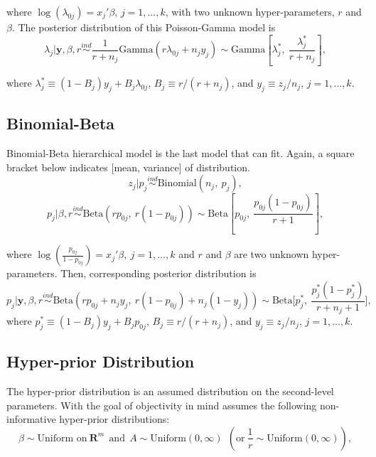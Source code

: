 \documentclass[article]{jss}
\begin{document}
where $\log(\lambda_{0j}) =x_{j}'\beta$, $j=1, \ldots, k$, with two unknown hyper-parameters, $r$ and $\beta$. The posterior distribution of this Poisson-Gamma model is
\begin{equation} \label{gammapost}
\lambda_{j}\vert \textbf{y}, \beta, r \stackrel{ind}{\sim}\frac{1}{r + n_{j}}\textrm{Gamma}(r\lambda_{0j} + n_{j}y_{j})\sim\textrm{Gamma} \left[\lambda^{\ast}_{j},~\frac{\lambda^{\ast}_{j}}{r+n_{j}} \right],
\end{equation}

where $\lambda^{\ast}_{j} \equiv (1-B_{j})y_{j} + B_{j}\lambda_{0j}$,  $B_{j}\equiv r / (r+n_{j})$, and $y_{j}\equiv z_{j} / n_{j}$, $j=1, \ldots, k$. 

\subsection[Binomial-Beta]{Binomial-Beta}
Binomial-Beta hierarchical model is the last model that  can fit. Again, a square bracket below indicates [mean, variance] of distribution.
\begin{equation}
z_{j} \vert p_{j}\stackrel{ind}{\sim}\textrm{Binomial}(n_{j}, ~p_{j}),
\end{equation}
\begin{equation}
p_{j} \vert \beta, r\stackrel{ind}{\sim}\textrm{Beta}(rp_{0j},~ r(1-p_{0j}))\sim \textrm{Beta} \left[p_{0j}, ~\frac{p_{0j}(1-p_{0j})}{r + 1} \right],
\end{equation}

where $\log(\frac{p_{0j}}{1-p_{0j}}) =x_{j}'\beta, ~j=1, \ldots, k$ and $r$ and $\beta$ are two unknown hyper-parameters. Then, corresponding posterior distribution is
\begin{equation} \label{betapost}
p_{j}\vert \textbf{y}, \beta, r \stackrel{ind}{\sim}\textrm{Beta}(rp_{0j}+n_{j}y_{j},~r(1-p_{0j})+n_{j}(1-y_{j}))\sim\textrm{Beta}\bigg[p^{\ast}_{j},~ \frac{p^{\ast}_{j}(1-p^{\ast}_{j})}{r+n_{j}+1}\bigg],
\end{equation}
where $p^{\ast}_{j}\equiv(1-B_{j})y_{j}+B_{j}p_{0j}$, $B_{j}\equiv r/ (r+n_{j})$, and $y_{j}\equiv z_{j} / n_{j}$, $j=1,\ldots,k$.


\subsection[Hyper-prior Distribution]{Hyper-prior Distribution}
The hyper-prior distribution is an assumed distribution on the second-level parameters. With the goal of objectivity in mind  assumes the following non-informative hyper-prior distributions:
\begin{equation}
\beta \sim \textrm{Uniform on}~ \mathbf{R}^{m}~~\textrm{and}~~A \sim \textrm{Uniform}(0, \infty) ~~(\textrm{or} ~\frac{1}{r}\sim \textrm{Uniform}(0, \infty)),
\end{equation}
\end{document}
